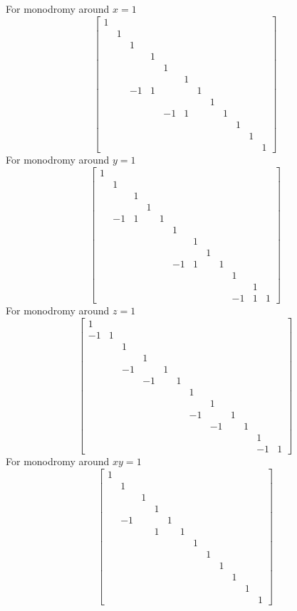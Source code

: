\documentclass[main]{subfiles}
\begin{document}
For monodromy around $x=1$
\[\begin{bmatrix}
1\\
&1\\
&&1\\
&&&1\\
&&&&1\\
&&&&&1\\
&&-1&1&&&1\\
&&&&&&&1\\
&&&&-1&1&&&1\\
&&&&&&&&&1\\
&&&&&&&&&&1\\
&&&&&&&&&&&1
\end{bmatrix}\]
For monodromy around $y=1$
\[\begin{bmatrix}
1\\
&1\\
&&1\\
&&&1\\
&-1&1&&1\\
&&&&&1\\
&&&&&&1\\
&&&&&&&1\\
&&&&&-1&1&&1\\
&&&&&&&&&1\\
&&&&&&&&&&1\\
&&&&&&&&&-1&1&1
\end{bmatrix}\]
For monodromy around $z=1$
\[\begin{bmatrix}
1\\
-1&1\\
&&1\\
&&&1\\
&&-1&&1\\
&&&-1&&1\\
&&&&&&1\\
&&&&&&&1\\
&&&&&&-1&&1\\
&&&&&&&-1&&1\\
&&&&&&&&&&1\\
&&&&&&&&&&-1&1
\end{bmatrix}\]
For monodromy around $xy=1$
\[\begin{bmatrix}
1\\
&1\\
&&1\\
&&&1\\
&-1&&&1\\
&&&1&&1\\
&&&&&&1\\
&&&&&&&1\\
&&&&&&&&1\\
&&&&&&&&&1\\
&&&&&&&&&&1\\
&&&&&&&&&&&1
\end{bmatrix}\]
\end{document}
